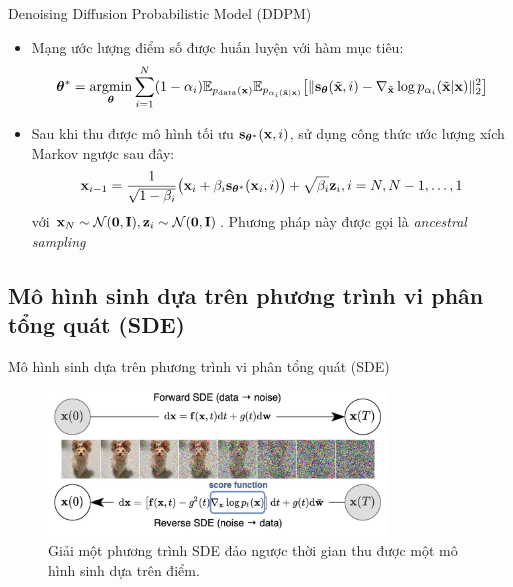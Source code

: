 \documentclass[10pt]{beamer}
\theoremstyle{remark}
\numberwithin{algocf}{section}
\numberwithin{equation}{section}
\numberwithin{dl}{section}
\numberwithin{figure}{section}
\begin{document}
\begin{frame}{Denoising Diffusion Probabilistic Model (DDPM)}
	\begin{itemize}
		\item Mạng ước lượng điểm số được huấn luyện với hàm mục tiêu:
		\begin{equation} \label{eq:3}
			\boldsymbol{\theta}^{\ast} = \underset{\boldsymbol{\theta}}{\mathrm{argmin}} \sum_{i=1}^N (1 - \alpha_i) \mathbb{E}_{p_{\mathrm{data}}(\bold{x})} \mathbb{E}_{p_{\alpha_i (\tilde{\bold{x}} \vert \bold{x})}} \big \lbrack \lVert \bold{s}_{\boldsymbol{\theta}} (\tilde{\bold{x}}, i) - \nabla_{\tilde{\bold{x}}} \log p_{\alpha_i} (\tilde{\bold{x}} \vert \bold{x}) \rVert_2^2 \big \rbrack
		\end{equation}
		\item Sau khi thu được mô hình tối ưu $\bold{s}_{\boldsymbol{\theta}^{\ast}}(\bold{x}, i)$, sử dụng công thức ước lượng xích Markov ngược sau đây:
		\begin{equation} \label{eq:4}
			\bold{x}_{i-1} = \dfrac{1}{\sqrt{1-\beta_i}} \big( \bold{x}_i + \beta_i \bold{s}_{\boldsymbol{\theta}^{\ast}} (\bold{x}_i, i) \big) + \sqrt{\beta_i} \bold{z}_i, i = N, N-1, \dots, 1
		\end{equation}
		với $\bold{x}_N \sim \mathcal{N}(\bold{0}, \bold{I}), \bold{z}_i \sim \mathcal{N}(\bold{0}, \bold{I})$. Phương pháp này được gọi là \textit{ancestral sampling}
	\end{itemize}
\end{frame}

\subsection{Mô hình sinh dựa trên phương trình vi phân tổng quát (SDE)}

\begin{frame}{Mô hình sinh dựa trên phương trình vi phân tổng quát (SDE)}
	\begin{figure}[H]
		\centering
		\includegraphics[width=0.8\textwidth]{1.jpg}
		\caption{Giải một phương trình SDE đảo ngược thời gian thu được một mô hình sinh dựa trên điểm.}
		\label{fig:1}
	\end{figure}
\end{frame}
\end{document}
